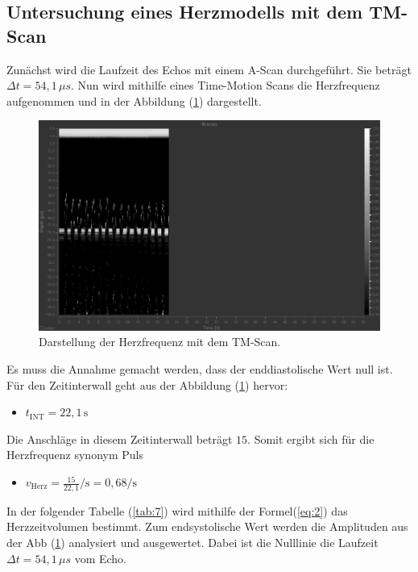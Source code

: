 \subsection{Untersuchung eines Herzmodells mit dem TM-Scan}
Zunächst wird die Laufzeit des Echos mit einem A-Scan durchgeführt.
Sie beträgt $\Delta t = 54,1 \, \mu s$.
Nun wird mithilfe eines Time-Motion Scans die Herzfrequenz aufgenommen und
in der Abbildung (\ref{abb:7}) dargestellt.
\begin{figure}[H]
  \centering
  \includegraphics[width=\textwidth]{content/HZV.png}
  \caption{Darstellung der Herzfrequenz mit dem TM-Scan.}
  \label{abb:7}
\end{figure}
Es muss die Annahme gemacht werden, dass der enddiastolische Wert null ist.
Für den Zeitinterwall geht aus der Abbildung (\ref{abb:7}) hervor:
\begin{itemize}
  \item $t_{\text{INT}} = 22,1 \, \si{\second}$
\end{itemize}
Die Anschläge in diesem Zeitinterwall beträgt $15$.
Somit ergibt sich für die Herzfrequenz synonym Puls
\begin{itemize}
  \item $v_{\text{Herz}} = \frac{15}{22,1} \si{\per\second} = 0,68 \si{\per\second}$
\end{itemize}
In der folgender Tabelle (\ref{tab:7}) wird mithilfe der Formel(\ref{eq:2}) das Herzzeitvolumen
bestimmt. Zum endsystolische Wert werden die Amplituden aus der Abb (\ref{abb:7}) analysiert und
ausgewertet. Dabei ist die Nulllinie die Laufzeit $\Delta t = 54,1 \, \mu s$ vom Echo.

